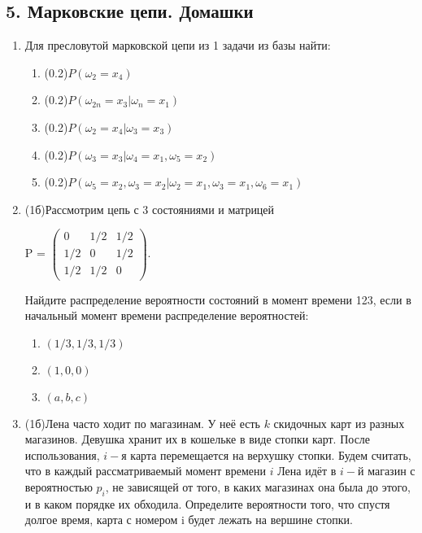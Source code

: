 \documentclass[a4paper, 14pt]{extarticle}
\begin{document}
\newpage
\subsection*{5. Марковские цепи. Домашки}
\begin{enumerate}

\item Для пресловутой марковской цепи из 1 задачи из базы найти:
\begin{enumerate}
    \item (0.2)$P(\omega_2 = x_4)$
    \item (0.2)$P(\omega_{2n} = x_3|\omega_n = x_1)$
    \item (0.2)$P(\omega_2 = x_4|\omega_3 = x_3)$
    \item (0.2)$P(\omega_3 = x_3|\omega_4 = x_1,\omega_5 = x_2)$
    \item (0.2)$P(\omega_5 = x_2, \omega_3 = x_2|\omega_2 = x_1, \omega_3 = x_1,\omega_6 = x_1)$
\end{enumerate}


\item (1б)Рассмотрим цепь с 3 состояниями и матрицей

\begin{center}
    P = $\left ( \begin{array}{ccc}
        0 & 1/2 & 1/2 \\
        1/2 & 0 & 1/2 \\
        1/2 & 1/2 & 0
    \end{array} \right ).$
\end{center}

Найдите распределение вероятности состояний в момент времени 123, если в начальный момент времени распределение вероятностей: 
\begin{enumerate}
    \item $(1/3, 1/3, 1/3)$
    \item $(1, 0, 0)$
    \item $(a, b, c)$
\end{enumerate}


\item (1б)Лена часто ходит по магазинам. У неё есть $k$ скидочных карт из разных магазинов. Девушка хранит их в кошельке в виде стопки карт. После использования, $i-$я карта перемещается на верхушку стопки. Будем считать, что в каждый рассматриваемый момент времени $i$ Лена идёт в $i-$й магазин с вероятностью $p_i$, не зависящей от того, в каких магазинах она была до этого, и в каком порядке их обходила. Определите вероятности того, что спустя долгое время, карта с номером i будет лежать на вершине стопки.


\end{enumerate}
\end{document}

